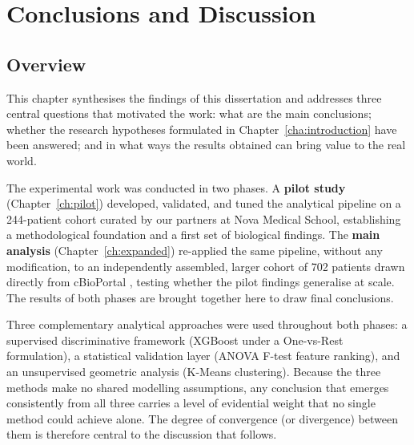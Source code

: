 
\chapter{Conclusions and Discussion}
\label{ch:discussion}
 
\section{Overview}
\label{sec:disc_overview}
 
This chapter synthesises the findings of this dissertation and addresses three
central questions that motivated the work: what are the main conclusions; whether
the research hypotheses formulated in Chapter~\ref{cha:introduction} have been
answered; and in what ways the results obtained can bring value to the real world.
 
The experimental work was conducted in two phases. A \textbf{pilot study}
(Chapter~\ref{ch:pilot}) developed, validated, and tuned the analytical pipeline on a
244-patient cohort curated by our partners at Nova Medical School, establishing a
methodological foundation and a first set of biological findings. The
\textbf{main analysis} (Chapter~\ref{ch:expanded}) re-applied the same pipeline, 
without any modification, to an independently assembled, larger cohort of 702 patients
drawn directly from cBioPortal \cite{cerami2012cbio, TCGA2012}, testing whether the pilot findings generalise at
scale. The results of both phases are brought together here to draw final conclusions.
 
Three complementary analytical approaches were used throughout both phases: a
supervised discriminative framework (XGBoost under a One-vs-Rest formulation),
a statistical validation layer (ANOVA F-test feature ranking), and an unsupervised
geometric analysis (K-Means clustering). Because the three methods make no shared
modelling assumptions, any conclusion that emerges consistently from all three carries
a level of evidential weight that no single method could achieve alone. The degree of
convergence (or divergence) between them is therefore central to the discussion that
follows.
 
